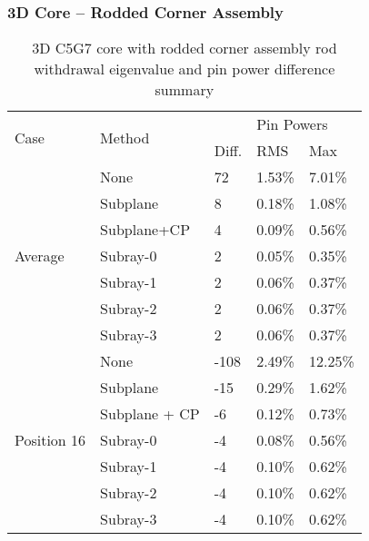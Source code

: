 \subsubsection{3D Core -- Rodded Corner Assembly}

\begin{table}[h]
    \centering
    \caption[3D C5G7 Core with Rodded Corner Assembly]{3D C5G7 core with rodded corner assembly rod withdrawal eigenvalue and pin power difference summary}\label{t:c5g7-3d-core-corner}
    \begin{tabular}{l l l l l}\toprule
        \multirow{2}{*}{Case} & \multirow{2}{*}{Method} & \keff{} & \multicolumn{2}{l}{Pin Powers} \\
        & & Diff. & RMS & Max \\\midrule
        \multirow{7}{*}{Average} & None        & 72 & 1.53\% & 7.01\% \\
        & Subplane    & 8  & 0.18\% & 1.08\% \\
        & Subplane+CP & 4  & 0.09\% & 0.56\% \\
        & Subray-0    & 2  & 0.05\% & 0.35\% \\
        & Subray-1    & 2  & 0.06\% & 0.37\% \\
        & Subray-2    & 2  & 0.06\% & 0.37\% \\
        & Subray-3    & 2  & 0.06\% & 0.37\% \\
        \midrule
        \multirow{7}{*}{Position 16} & None          & -108 & 2.49\% & 12.25\% \\
        & Subplane      & -15 & 0.29\% & 1.62\% \\
        & Subplane + CP & -6 & 0.12\% & 0.73\% \\
        & Subray-0      & -4 & 0.08\% & 0.56\% \\
        & Subray-1      & -4 & 0.10\% & 0.62\% \\
        & Subray-2      & -4 & 0.10\% & 0.62\% \\
        & Subray-3      & -4 & 0.10\% & 0.62\% \\
        \bottomrule
    \end{tabular}
\end{table}

